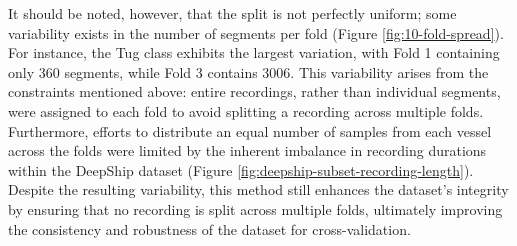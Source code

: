 It should be noted, however, that the split is not perfectly uniform; some variability exists in the number of segments per fold (Figure \ref{fig:10-fold-spread}). For instance, the Tug class exhibits the largest variation, with Fold 1 containing only 360 segments, while Fold 3 contains 3006. This variability arises from the constraints mentioned above: entire recordings, rather than individual segments, were assigned to each fold to avoid splitting a recording across multiple folds. Furthermore, efforts to distribute an equal number of samples from each vessel across the folds were limited by the inherent imbalance in recording durations within the DeepShip dataset (Figure \ref{fig:deepship-subset-recording-length}). Despite the resulting variability, this method still enhances the dataset's integrity by ensuring that no recording is split across multiple folds, ultimately improving the consistency and robustness of the dataset for cross-validation.

